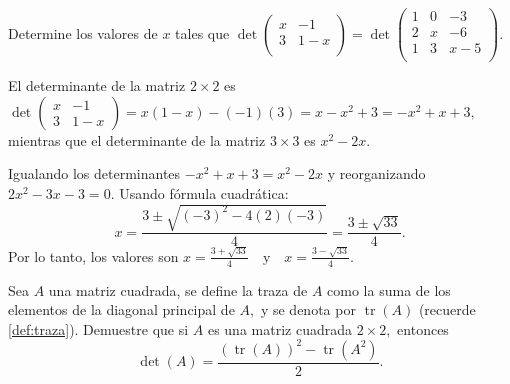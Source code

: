 \begin{prob}
Determine los valores de $x$ tales que \( \det \left( \begin{array}{cc}
x & -1 \\
3 & 1-x \\  
\end{array} \right) = \det \left( \begin{array}{ccc}
1 & 0 & -3 \\
2 & x & -6 \\
1 & 3 & x-5 \\  
\end{array} \right) \).

\begin{myproof}
El determinante de la matriz $2 \times 2$ es $
\det \left( \begin{array}{cc} x & -1 \\ 3 & 1-x \end{array} \right) = x(1-x) - (-1)(3) = x - x^2 + 3 = -x^2 + x + 3,$ mientras que el determinante de la matriz $3 \times 3$ es $ x^2 - 2x. $ 

Igualando los determinantes $-x^2 + x + 3 = x^2 - 2x$ y reorganizando $2x^2 - 3x - 3 = 0.$ Usando fórmula cuadrática: \[
x = \frac{3 \pm \sqrt{(-3)^2 - 4(2)(-3)}}{4} = \frac{3 \pm \sqrt{33}}{4}.
\]
Por lo tanto, los valores son $
x = \frac{3 + \sqrt{33}}{4} \quad \text{y} \quad x = \frac{3 - \sqrt{33}}{4}.$
\end{myproof}
\end{prob}

\begin{prob} 
Sea $A$ una matriz cuadrada, se define la traza de $A$ como la suma de los elementos de la diagonal principal de $A,$ y se denota por $\operatorname{tr}(A)$ (recuerde \ref{def:traza}). Demuestre que si $A$ es una matriz cuadrada $2\times 2,$ entonces 
$$\det(A)=\dfrac{\left( \operatorname{tr}(A) \right)^{2}-\operatorname{tr}\left( A^{2} \right)}{2}.$$ 
\end{prob}


